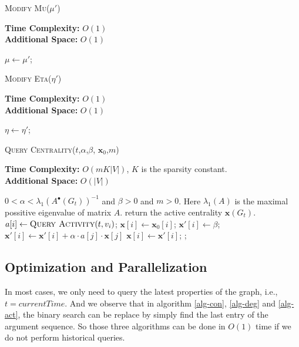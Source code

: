 \documentclass[12pt,abstract=true]{scrartcl}
\numberwithin{equation}{section}
\theoremstyle{definition}   \newtheorem{definition}{Definition}[section]
\theoremstyle{plain}        \newtheorem{theorem}{Theorem}[section]
\theoremstyle{plain}        \newtheorem{observation}{Observation}[section]
\theoremstyle{plain}        \newtheorem{fact}{Fact}[section]
\theoremstyle{plain}        \newtheorem{claim}{Claim}[section]
\theoremstyle{plain}        \newtheorem{lemma}[theorem]{Lemma}
\theoremstyle{plain}        \newtheorem{corollary}[theorem]{Corollary}
\theoremstyle{remark}       \newtheorem{example}{Example}[section]
\theoremstyle{remark}       \newtheorem{remark}{Remark}[section]
\begin{document}
\begin{algorithm}[htbp]
\caption{\textsc{Modify Mu}($\mu'$)}
\label{alg-mu}
\textbf{Time Complexity:} $O(1)$\\
\textbf{Additional Space:} $O(1)$
\begin{algorithmic}[1]
\State $\mu\gets\mu'$;
\end{algorithmic}
\end{algorithm}

\begin{algorithm}[htbp]
\caption{\textsc{Modify Eta}($\eta'$)}
\label{alg-eta}
\textbf{Time Complexity:} $O(1)$\\
\textbf{Additional Space:} $O(1)$
\begin{algorithmic}[1]
\State $\eta\gets\eta'$;\State{}
\end{algorithmic}
\end{algorithm}


\begin{algorithm}[htbp]
\caption{\textsc{Query Centrality}($t$,$\alpha$,$\beta$,
$\mathbf{x}_0$,$m$)}
\label{alg-cen}
\textbf{Time Complexity:} $O(mK|V|)$, $K$ is the sparsity constant.\\
\textbf{Additional Space:} $O(|V|)$
\begin{algorithmic}[1]
\Require $0<\alpha<\lambda_1(A^\bullet(G_t))^{-1}$ and $\beta>0$ and $m>0$. Here
$\lambda_1(A)$ is the maximal possitive eigenvalue of matrix $A$.
\Ensure return the active centrality $\mathbf{x}(G_t)$.
\State $a[i]\gets \Call{Query Activity}{t,v_i}$;
\State $\mathbf{x}[i]\gets \mathbf{x}_0[i]$;
\EndFor
{}
\State $\mathbf{x'}[i]\gets \beta$;
\EndFor
{}
\State $\mathbf{x'}[i]\gets \mathbf{x'}[i]+\alpha\cdot a[j]\cdot\mathbf{x}[j]$
\EndFor\EndFor
{}
\State $\mathbf{x}[i]\gets \mathbf{x'}[i]$;
\EndFor
\EndFor
\State{};
\end{algorithmic}
\end{algorithm}

\subsection{Optimization and Parallelization}
In most cases, we only need to query the latest properties of the graph, i.e.,
$t=\mathit{currentTime}$. And we observe that in algorithm \ref{alg-con},
\ref{alg-deg} and \ref{alg-act}, the binary search can be replace by simply find
the last entry of the argument sequence. So those three algorithms can be done
in $O(1)$ time if we do not perform historical queries.
\end{document}
